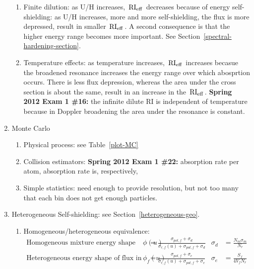 \documentclass{school-22.211-notes}
\begin{document}
\begin{enumerate}
\begin{enumerate}
    \item Finite dilution: as U/H increases, $\left. \mathrm{RI}_{\mathrm{eff}} \right.$ decreases because of energy self-shielding: as U/H increases, more and more self-shielding, the flux is more depressed, result in smaller $\left. \mathrm{RI}_{\mathrm{eff}} \right.$. A second consequence is that the higher energy range becomes more important. See Section~\ref{spectral-hardening-section}. 
    \item Temperature effects: as temperature increases, $\left. \mathrm{RI}_{\mathrm{eff}} \right.$ increases becasue the broadened resonance increases the energy range over which abosprtion occurs. There is less flux depression, whereas the area under the cross section is about the same, result in an increase in the $\left. \mathrm{RI}_{\mathrm{eff}} \right.$. \textbf{Spring 2012 Exam 1 \#16:} the infinite dilute RI is independent of temperature because in Doppler broadening the area under the resonance is constant. 
  \end{enumerate}

\item Monte Carlo
  \begin{enumerate}
    \item Physical process:  see Table~\ref{plot-MC}
    \item Collision estimators: \textbf{Spring 2012 Exam 1 \#22:}   absorption  rate per atom, absorption rate is, respectively, 
    \item Simple statistics:  need enough to provide resolution, but not too many that each bin does not get enough particles.
  \end{enumerate}
  
\item Heterogeneous Self-shielding: see Section~\ref{heterogeneous-geo}.
  \begin{enumerate}
    \item Homogeneous/heterogeneous equivalence: 
      \begin{align*}
        \mbox{Homogeneous mixture energy shape of flux } \phi(u) &= \frac{\sigma_{pot, f} + \sigma_d}{\sigma_{r,f} (u) + \sigma_{pot, f} + \sigma_d}   & \sigma_d &= \frac{N_m \sigma_m}{N_r}  \\
        \mbox{Heterogeneous energy shape of flux in the fuel } \phi_f(u) &= \frac{\sigma_{pot, f} + \sigma_e}{\sigma_{r,f} (u) + \sigma_{pot, f} + \sigma_e}   & \sigma_e &= \frac{S_f}{4 V_f N_r} 
      \end{align*}


\end{enumerate}
\end{enumerate}
\end{document}
